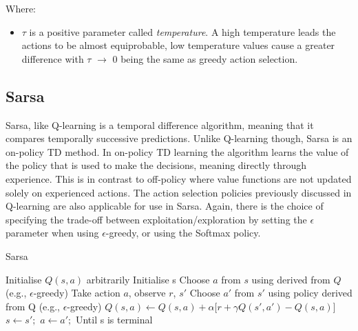 \documentclass[11pt]{article}
\begin{document}
\noindent Where:
\begin{itemize}
	\item $\tau$ is a positive parameter called \emph{temperature}. A high temperature leads the actions to be almost equiprobable, low temperature values cause a greater difference with $\tau$ $\rightarrow$ 0 being the same as greedy action selection.
\end{itemize}
\vspace*{10mm}


\subsection{Sarsa}
Sarsa, like Q-learning is a temporal difference algorithm, meaning that it compares temporally successive predictions. Unlike Q-learning though, Sarsa is an on-policy TD method. In on-policy TD learning the algorithm learns the value of the policy that is used to make the decisions, meaning directly through experience. This is in contrast to off-policy where value functions are not updated solely on experienced actions. The action selection policies previously discussed in Q-learning are also applicable for use in Sarsa. Again, there is the choice of specifying the trade-off between exploitation/exploration by setting the $\epsilon$ parameter when using $\epsilon$-greedy, or using the Softmax policy.

\begin{algorithm}
\caption{Sarsa}
\begin{algorithmic}[1]
\label{sarsa}
\STATE Initialise $Q(s,a)$ arbitrarily
\STATE Initialise s
\STATE Choose $a$ from $s$ using derived from $Q$ (e.g., $\epsilon$-greedy)
\STATE Take action $a$, observe $r$, $s'$
\STATE Choose $a'$ from $s'$ using policy derived from Q (e.g., $\epsilon$-greedy)
\STATE $Q(s,a) \leftarrow Q(s,a) + \alpha \lbrack r + \gamma Q(s',a') - Q(s,a)\rbrack$
\STATE $s \leftarrow s';$ $a \leftarrow a';$
\ENDFOR
\STATE Until s is terminal
\ENDFOR
\end{algorithmic}
\end{algorithm}
\end{document}
